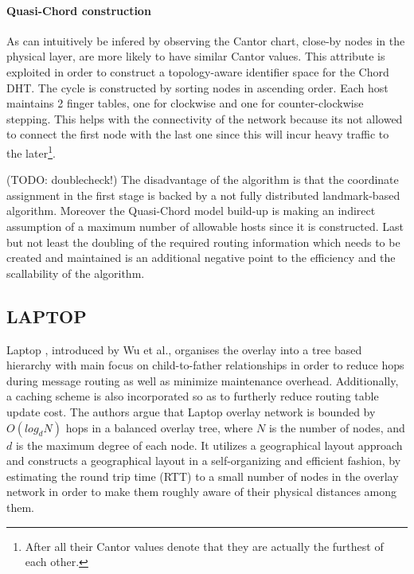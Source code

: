 \documentclass[a4paper,10pt]{article}
\begin{document}
\paragraph{Quasi-Chord construction} As can intuitively be infered by observing the Cantor chart, close-by nodes in the physical layer, are more likely to have similar Cantor values. This attribute is exploited in order to construct a topology-aware identifier space for the Chord DHT. The cycle is constructed by sorting nodes in ascending order. Each host maintains 2 finger tables, one for clockwise and one for counter-clockwise stepping. This helps with the connectivity of the network because its not allowed to connect the first node with the last one since this will incur heavy traffic to the later\footnote{After all their Cantor values denote that they are actually the furthest of each other.}.

(TODO: doublecheck!) The disadvantage of the algorithm is that the coordinate assignment in the first stage is backed by a not fully distributed landmark-based algorithm. Moreover the Quasi-Chord model build-up is making an indirect assumption of a maximum number of allowable hosts since it is constructed. Last but not least the doubling of the required routing information which needs to be created and maintained is an additional negative point to the efficiency and the scallability of the algorithm.

\subsection{LAPTOP}
Laptop \cite{wu_laptop_2007}, introduced by Wu et al., organises the overlay into a tree based hierarchy with main focus on child-to-father relationships in order to reduce hops during message routing as well as minimize maintenance overhead. Additionally, a caching scheme is also incorporated so as to furtherly reduce routing table update cost. The authors argue that Laptop overlay network is bounded by $O\left( log_d N \right)$ hops in a balanced overlay tree, where $N$ is the number of nodes, and $d$ is the maximum degree of each node. It utilizes a geographical layout approach  and constructs a geographical layout in a self-organizing and efficient fashion, by estimating the round trip time (RTT) to a small number of nodes in the overlay network in order to make them roughly aware of their physical distances among them.
\end{document}
